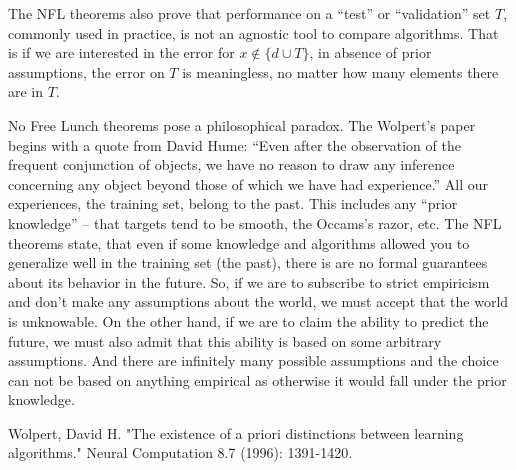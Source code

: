 \documentclass[a4paper]{article}
\begin{document}
The NFL theorems also prove that performance on a ``test'' or
``validation'' set $T$, commonly used in practice, is not an agnostic
tool to compare algorithms. That is if we are interested in the error
for $x\notin \{d \cup T\}$, in absence of prior assumptions, the error
on $T$ is meaningless, no matter how many elements there are in $T$.

No Free Lunch theorems pose a philosophical paradox. The Wolpert's
paper begins with a quote from David Hume: ``Even after the
observation of the frequent conjunction of objects, we have no reason
to draw any inference concerning any object beyond those of which we
have had experience.'' All our experiences, the training set, belong
to the past. This includes any ``prior knowledge'' -- that targets
tend to be smooth, the Occams's razor, etc. The NFL theorems state,
that even if some knowledge and algorithms allowed you to generalize
well in the training set (the past), there is are no formal guarantees
about its behavior in the future. So, if we are to subscribe to strict
empiricism and don't make any assumptions about the world, we must
accept that the world is unknowable. On the other hand, if we are to
claim the ability to predict the future, we must also admit that this
ability is based on some arbitrary assumptions. And there are
infinitely many possible assumptions and the choice can not be based
on anything empirical as otherwise it would fall under the prior
knowledge.


\begin{thebibliography}{99}
 Wolpert, David H. "The existence of a
  priori distinctions between learning algorithms." Neural Computation
  8.7 (1996): 1391-1420.
\end{thebibliography}
\end{document}
